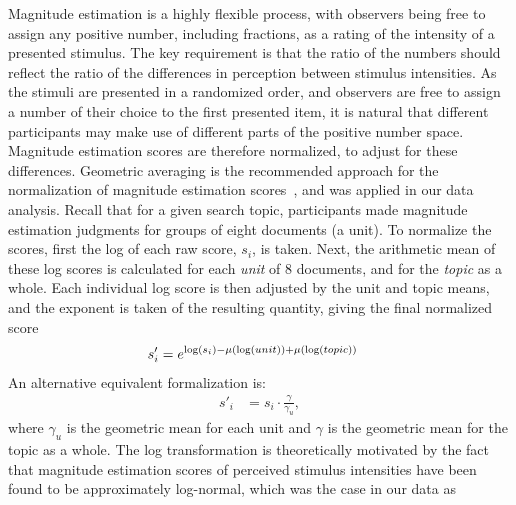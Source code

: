 Magnitude estimation is a highly flexible process, with observers being
free to assign any positive number, including fractions, as a rating of
the intensity of a presented stimulus.
The key requirement is that the ratio of the numbers should reflect the
ratio of the differences in perception between stimulus intensities.
As the stimuli are presented in a randomized order, and observers are
free to assign a number of their choice to the first presented item, it
is natural that different participants may make use of different parts
of the positive number space.
Magnitude estimation scores are therefore normalized, to adjust for
these differences.
Geometric averaging is the recommended approach for the normalization
of magnitude estimation scores~\cite{Ges97,McG03,moskowitz:1977}, and
was applied in our data analysis.
Recall that for a given search topic, participants made magnitude
estimation judgments for groups of eight documents (a unit).
To normalize the scores, first the log of each raw score, $s_i$, is
taken. Next, the arithmetic mean of these log scores is calculated for
each {\emph{unit}} of 8 documents, and for the {\emph{topic}} as a
whole. 
Each individual log score is then adjusted by the unit and topic means,
and the exponent is taken of the resulting quantity, giving the final
normalized score 
\begin{align}
  s'_i &= e^{\log(s_i) - \mu(\log(\mathnormal{unit})) + \mu
           (\log(\mathnormal{topic})) } \label{eq:1}
\end{align}
An alternative equivalent formalization is: 
\begin{align}
s'_i &= s_i \cdot \frac{\gamma}{\gamma_u}, 
\label{eq:2}
\end{align}
where $\gamma_u$ is the geometric mean for each unit and $\gamma$ is
the geometric mean for the topic as a whole.
The log transformation is theoretically motivated by the fact that
magnitude estimation scores of perceived stimulus intensities have been
found to be approximately log-normal, which was the case in our data as
